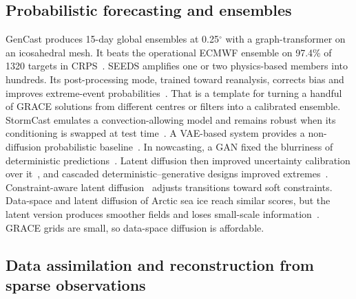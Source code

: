 \subsection{Probabilistic forecasting and ensembles}

GenCast produces 15-day global ensembles at 0.25$^\circ$ with a graph-transformer on an icosahedral mesh. It beats the operational ECMWF ensemble on 97.4\% of 1320 targets in CRPS~\cite{price2025gencast}. SEEDS amplifies one or two physics-based members into hundreds. Its post-processing mode, trained toward reanalysis, corrects bias and improves extreme-event probabilities~\cite{li2024seeds}. That is a template for turning a handful of GRACE solutions from different centres or filters into a calibrated ensemble. StormCast emulates a convection-allowing model and remains robust when its conditioning is swapped at test time~\cite{pathak2026stormcast}. A VAE-based system provides a non-diffusion probabilistic baseline~\cite{zhong2025fuxiens}. In nowcasting, a GAN fixed the blurriness of deterministic predictions~\cite{ravuri2021dgmr}. Latent diffusion then improved uncertainty calibration over it~\cite{leinonen2023ldcast}, and cascaded deterministic--generative designs improved extremes~\cite{gong2024cascast}. Constraint-aware latent diffusion~\cite{gao2023prediff} adjusts transitions toward soft constraints. Data-space and latent diffusion of Arctic sea ice reach similar scores, but the latent version produces smoother fields and loses small-scale information~\cite{finn2024seaice}. GRACE grids are small, so data-space diffusion is affordable.

\subsection{Data assimilation and reconstruction from sparse observations}

